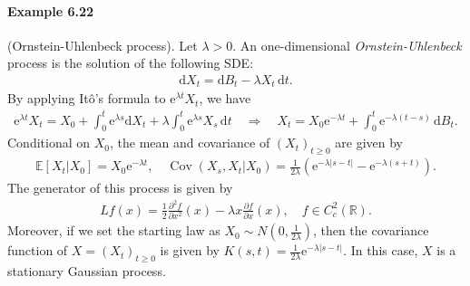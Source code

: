 \documentclass{article}
\numberwithin{equation}{section}
\newcommand{\e}{\mathrm{e}}
\newcommand{\E}{\mathbb{E}}
\DeclareMathOperator{\cov}{Cov}
\renewcommand{\d}{\mathrm{d}}
\theoremstyle{plain}
\theoremstyle{definition}
\begin{document}
\paragraph{Example 6.22\label{example:6.22}} (Ornstein-Uhlenbeck process). Let $\lambda>0$. An one-dimensional \textit{Ornstein-Uhlenbeck} process is the solution of the following SDE:
\begin{align*}
	\d X_t = \d B_t - \lambda X_t\,\d t.
\end{align*}
By applying Itô's formula to $\e^{\lambda t} X_t$, we have
\begin{align*}
	\e^{\lambda t} X_t = X_0 + \int_0^t\e^{\lambda s}\d X_t + \lambda\int_0^t\e^{\lambda s}X_s\,\d t\quad\Rightarrow\quad X_t = X_0\e^{-\lambda t} + \int_0^t\e^{-\lambda(t-s)}\,\d B_t.
\end{align*}
Conditional on $X_0$, the mean and covariance of $(X_t)_{t\geq 0}$ are given by
\begin{align*}
	\E[X_t|X_0] = X_0\e^{-\lambda t},\quad \cov(X_s,X_t|X_0) = \frac{1}{2\lambda}\left(\e^{-\lambda\vert s-t\vert}-\e^{-\lambda(s+t)}\right).
\end{align*}
The generator of this process is given by
\begin{align*}
	Lf(x) = \frac{1}{2}\frac{\partial^2 f}{\partial x^2}(x) - \lambda x\frac{\partial f}{\partial x}(x),\quad f\in C_c^2(\mathbb{R}).
\end{align*}
Moreover, if we set the starting law as $X_0\sim N(0,\frac{1}{2\lambda})$, then the covariance function of $X=(X_t)_{t\geq 0}$ is given by $K(s,t)=\frac{1}{2\lambda}\e^{-\lambda\vert s-t\vert}$.  In this case, $X$ is a stationary Gaussian process. 
\end{document}
